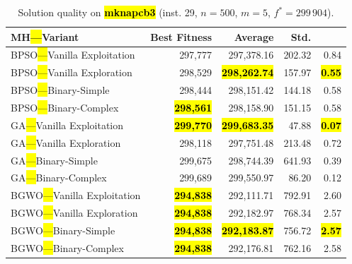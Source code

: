 \documentclass[mathematics,article,accept,moreauthors]{Definitions/mdpi}
\begin{document}
\vspace{-9pt}

\begin{table}[H]
  \small
  \caption{Solution quality on \textbf{\hl{mknapcb3}} (inst. 29, $n=500$, $m=5$, $f^*=299\,904$).}
  \label{tab:calidad_mknapcb3_29}
  \begin{tabularx}{\textwidth}{lRRRR}
    \toprule
    \textbf{MH\hl{---}Variant} &
    \textbf{Best Fitness} &
    \textbf{Average} &
    \textbf{Std.} &
    \textbf{} \\
    \midrule
    BPSO\hl{---}Vanilla Exploitation &         297,777 &        297,378.16 & 202.32 &         0.84 \\
    BPSO\hl{---}Vanilla Exploration  &         298,529 & \textbf{\hl{298,262.74}} & 157.97 & \textbf{\hl{0.55}} \\
    BPSO\hl{---}Binary-Simple        &         298,444 &        298,151.42 & 144.18 &         0.58 \\
    BPSO\hl{---}Binary-Complex       & \textbf{\hl{298,561}} &        298,158.90 & 151.15 &         0.58 \\
    \midrule
    GA\hl{---}Vanilla Exploitation   & \textbf{\hl{299,770}} & \textbf{\hl{299,683.35}} &  47.88 & \textbf{\hl{0.07}} \\
    GA\hl{---}Vanilla Exploration    &         298,118 &        297,751.48 & 213.48 &         0.72 \\
    GA\hl{---}Binary-Simple          &         299,675 &        298,744.39 & 641.93 &         0.39 \\
    GA\hl{---}Binary-Complex         &         299,689 &        299,550.97 &  86.20 &         0.12 \\
    \midrule
    BGWO\hl{---}Vanilla Exploitation & \textbf{\hl{294,838}} &        292,111.71 & 792.91 &         2.60 \\
    BGWO\hl{---}Vanilla Exploration  & \textbf{\hl{294,838}} &        292,182.97 & 768.34 &         2.57 \\
    BGWO\hl{---}Binary-Simple        & \textbf{\hl{294,838}} & \textbf{\hl{292,183.87}} & 756.72 & \textbf{\hl{2.57}} \\
    BGWO\hl{---}Binary-Complex       & \textbf{\hl{294,838}} &        292,176.81 & 762.16 &         2.58 \\


\bottomrule
\end{tabularx} %
\end{table}
\end{document}

